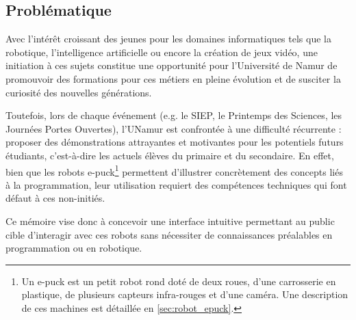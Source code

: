 \subsection{Problématique} \label{sec:problématiques}

Avec l’intérêt croissant des jeunes pour les domaines informatiques tels que la robotique, l’intelligence artificielle ou encore la création de jeux vidéo, une initiation à ces sujets constitue une opportunité pour l’Université de Namur de promouvoir des formations pour ces métiers en pleine évolution et de susciter la curiosité des nouvelles générations.  

Toutefois, lors de chaque événement (e.g. le SIEP, le Printemps des Sciences, les Journées Portes Ouvertes), l’UNamur est confrontée à une difficulté récurrente : proposer des démonstrations attrayantes et motivantes pour les potentiels futurs étudiants, c'est-à-dire les actuels élèves du primaire et du secondaire. 
En effet, bien que les robots e-puck\footnote{Un e-puck est un petit robot rond doté de deux roues, d'une carrosserie en plastique, de plusieurs capteurs infra-rouges et d'une caméra. Une description de ces machines est détaillée en \autoref{sec:robot_epuck}.} permettent d’illustrer concrètement des concepts liés à la programmation, leur utilisation requiert des compétences techniques qui font défaut à ces non-initiés.

Ce mémoire vise donc à concevoir une interface intuitive permettant au public cible d’interagir avec ces robots sans nécessiter de connaissances préalables en programmation ou en robotique.  
